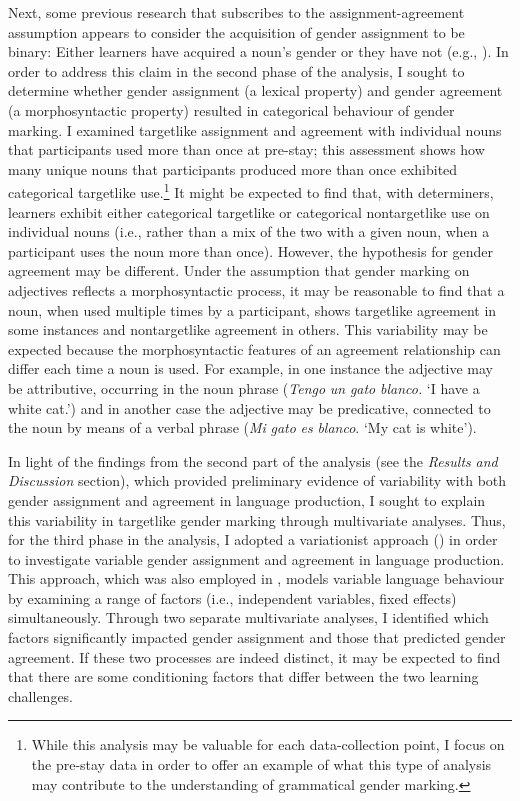 \documentclass[output=paper,colorlinks,citecolor=brown,modfonts,nonflat]{../langscibook}
\begin{document}
Next, some previous research that subscribes to the assignment-agreement assumption appears to consider the acquisition of gender assignment to be binary: Either learners have acquired a noun’s gender or they have not (e.g., \citealt{Alarcón2010}). In order to address this claim in the second phase of the analysis, I sought to determine whether gender assignment (a lexical property) and gender agreement (a morphosyntactic property) resulted in categorical behaviour of gender marking. I examined targetlike assignment and agreement with individual nouns that participants used more than once at pre-stay; this assessment shows how many unique nouns that participants produced more than once exhibited categorical targetlike use.\footnote{{While this analysis may be valuable for each data-collection point, I focus on the pre-stay data in order to offer an example of what this type of analysis may contribute to the understanding of grammatical gender marking.}} It might be expected to find that, with determiners, learners exhibit either categorical targetlike or categorical nontargetlike use on individual nouns (i.e., rather than a mix of the two with a given noun, when a participant uses the noun more than once). However, the hypothesis for gender agreement may be different. Under the assumption that gender marking on adjectives reflects a morphosyntactic process, it may be reasonable to find that a noun, when used multiple times by a participant, shows targetlike agreement in some instances and nontargetlike agreement in others. This variability may be expected because the morphosyntactic features of an agreement relationship can differ each time a noun is used. For example, in one instance the adjective may be attributive, occurring in the noun phrase (\textit{Tengo} \textit{un} \textit{gato} \textit{blanco.} ‘I have a white cat.’) and in another case the adjective may be predicative, connected to the noun by means of a verbal phrase (\textit{Mi} \textit{gato} \textit{es} \textit{blanco}. ‘My cat is white’).



In light of the findings from the second part of the analysis (see the \textit{Results} \textit{and} \textit{Discussion} section), which provided preliminary evidence of variability with both gender assignment and agreement in language production, I sought to explain this variability in targetlike gender marking through multivariate analyses. Thus, for the third phase in the analysis, I adopted a variationist approach (\citealt{GeeslinLong2014}) in order to investigate variable gender assignment and agreement in language production. This approach, which was also employed in \citet{GudmestadEtAl2019}, models variable language behaviour by examining a range of factors (i.e., independent variables, fixed effects) simultaneously. Through two separate multivariate analyses, I identified which factors significantly impacted gender assignment and those that predicted gender agreement. If these two processes are indeed distinct, it may be expected to find that there are some conditioning factors that differ between the two learning challenges. 
\end{document}
